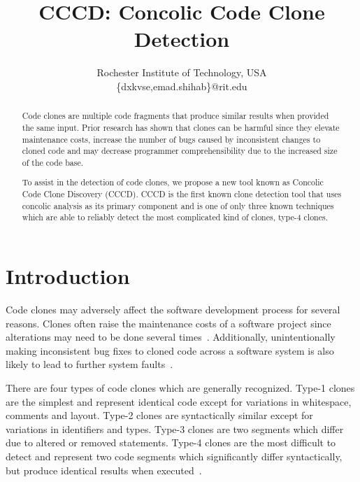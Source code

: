 \documentclass[conference]{IEEEtran}
\begin{document}
\title{CCCD: Concolic Code Clone Detection}

\author{
Rochester Institute of Technology, USA\\
\{dxkvse,emad.shihab\}@rit.edu
}
\maketitle
\begin{abstract}


Code clones are multiple code fragments that produce similar results when provided the same input. Prior research has shown that clones can be harmful since they elevate maintenance costs, increase the number of bugs caused by inconsistent changes to cloned code and may decrease programmer comprehensibility due to the increased size of the code base.  

To assist in the detection of code clones, we propose a new tool known as Concolic Code Clone Discovery (CCCD). CCCD is the first known clone detection tool that uses concolic analysis as its primary component and is one of only three known techniques which are able to reliably detect the most complicated kind of clones, type-4 clones.


\end{abstract}


\IEEEpeerreviewmaketitle

\section{Introduction}



Code clones may adversely affect the software development process for several reasons. Clones often raise the maintenance costs of a software project since alterations may need to be done several times~\cite{Juergens:2009:CCM:1555001.1555062}. Additionally, unintentionally making inconsistent bug fixes to cloned code across a software system is also likely to lead to further system faults~\cite{Deissenboeck_2010}. 

There are four types of code clones which are generally recognized. Type-1 clones are the simplest and represent identical code except for variations in whitespace, comments and layout. Type-2 clones are syntactically similar except for variations in identifiers and types. Type-3 clones are two segments which differ due to altered or removed statements. Type-4 clones are the most difficult to detect and represent two code segments which significantly differ syntactically, but produce identical results when executed~\cite{Gold:2010:ICC:1808901.1808916}. 
\end{document}
